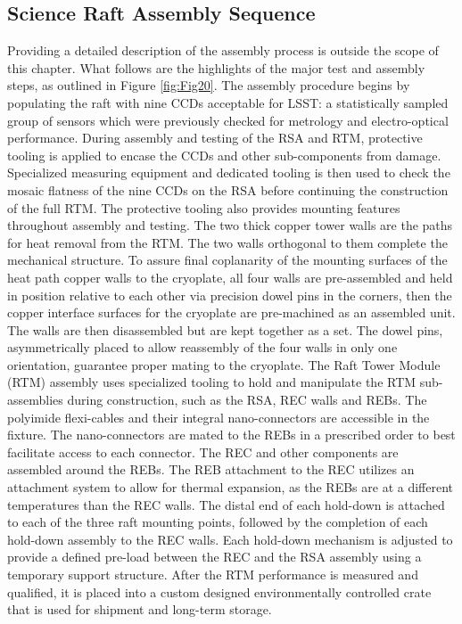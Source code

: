 \subsection{Science Raft Assembly Sequence}
Providing a detailed description of the assembly process is outside the scope of this chapter. What follows are the highlights of the major test and assembly steps, as outlined in Figure \ref{fig:Fig20}.
The assembly procedure begins by populating the raft with nine CCDs acceptable for LSST: a statistically sampled group of sensors which were previously checked for metrology and electro-optical performance. During assembly and testing of the RSA and RTM, protective tooling is applied to encase the CCDs and other sub-components from damage. Specialized measuring equipment and dedicated tooling is then used to check the mosaic flatness of the nine CCDs on the RSA before continuing the construction of the full RTM. The protective tooling also provides mounting features throughout assembly and testing.
The two thick copper tower walls are the paths for heat removal from the RTM. The two walls orthogonal to them complete the mechanical structure. To assure final coplanarity of the mounting surfaces of the heat path copper walls to the cryoplate, all four walls are pre-assembled and held in position relative to each other via precision dowel pins in the corners, then the copper interface surfaces for the cryoplate are pre-machined as an assembled unit. The walls are then disassembled but are kept together as a set. The dowel pins, asymmetrically placed to allow reassembly of the four walls in only one orientation, guarantee proper mating to the cryoplate.
The Raft Tower Module (RTM) assembly uses specialized tooling to hold and manipulate the RTM sub-assemblies during construction, such as the RSA, REC walls and REBs. The polyimide flexi-cables and their integral nano-connectors are accessible in the fixture. The nano-connectors are mated to the REBs in a prescribed order to best facilitate access to each connector. The REC and other components are assembled around the REBs. The REB attachment to the REC utilizes an attachment system to allow for thermal expansion, as the REBs are at a different temperatures than the REC walls. The distal end of each hold-down is attached to each of the three raft mounting points, followed by the completion of each hold-down assembly to the REC walls. Each hold-down mechanism is adjusted to provide a defined pre-load between the REC and the RSA assembly using a temporary support structure. After the RTM performance is measured and qualified, it is placed into a custom designed environmentally controlled crate that is used for shipment and long-term storage.

